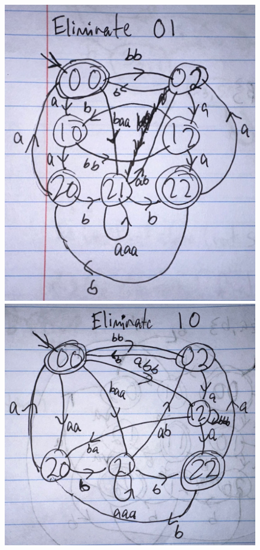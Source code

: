 \documentclass[12pt]{article}
\begin{document}
\begin{figure} [!h]
	\centering
	\includegraphics[scale=.2]{14.10.3.3}
	\includegraphics[scale=.2]{14.10.3.4}
\end{figure}
\end{document}
